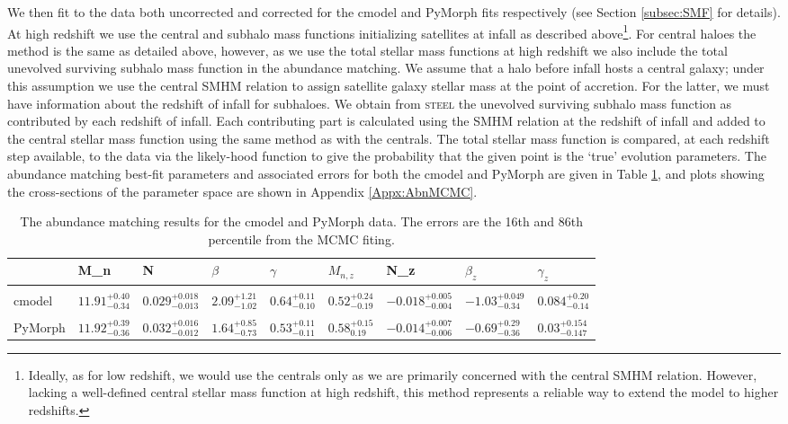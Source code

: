 We then fit to the \cite{Davidzon2017TheSnapshots} data both uncorrected and corrected for the cmodel and PyMorph fits respectively (see Section \ref{subsec:SMF} for details). At high redshift we use the central and subhalo mass functions initializing satellites at infall as described above\footnote{Ideally, as for low redshift, we would use the centrals only as we are primarily concerned with the central SMHM relation. However, lacking a well-defined central stellar mass function at high redshift, this method represents a reliable way to extend the model to higher redshifts.}. For central haloes the method is the same as detailed above, however, as we use the total stellar mass functions at high redshift we also include the total unevolved surviving subhalo mass function in the abundance matching. 
We assume that a halo before infall hosts a central galaxy; under this assumption we use the central SMHM relation to assign satellite galaxy stellar mass at the point of accretion. For the latter, we must have information about the redshift of infall for subhaloes. We obtain from \textsc{steel} the unevolved surviving subhalo mass function as contributed by each redshift of infall. Each contributing part is calculated using the SMHM relation at the redshift of infall and added to the central stellar mass function using the same method as with the centrals. The total stellar mass function is compared, at each redshift step available, to the data via the likely-hood function to give the probability that the given point is the `true' evolution parameters. The abundance matching best-fit parameters and associated errors for both the cmodel and PyMorph are given in Table \ref{tab:AbnResult}, and plots showing the cross-sections of the parameter space are shown in Appendix \ref{Appx:AbnMCMC}.

\begin{table}
\centering
\begin{tabular}{l|llllllll}
        & M\_n & N     & $\beta$ & $\gamma$ & $M_{n,z}$ & N\_z   & $\beta_z$ & $\gamma_z$ \\ \hline
\\
cmodel  & $11.91_{-0.34}^{+0.40}$ & $0.029_{-0.013}^{+0.018}$ & $2.09_{-1.02}^{+1.21}$    & $0.64_{-0.10}^{+0.11}$     & $0.52_{-0.19}^{+0.24}$       & $-0.018_{-0.004}^{+0.005}$ & $-1.03_{-0.34}^{+0.049}$     & $0.084_{-0.14}^{+0.20}$      \\
\\
PyMorph & $11.92_{-0.36}^{+0.39}$ & $0.032_{-0.012}^{+0.016}$ & $1.64_{-0.73}^{+0.85}$     & $0.53_{-0.11}^{+0.11}$     & $0.58_{0.19}^{+0.15}$        & $-0.014_{-0.006}^{+0.007}$ & $-0.69_{-0.36}^{+0.29}$      & $0.03_{-0.147}^{+0.154}$      
\end{tabular}
\caption{The abundance matching results for the cmodel and PyMorph data. The errors are the 16th and 86th percentile from the MCMC fiting.}
\label{tab:AbnResult}
\end{table}

